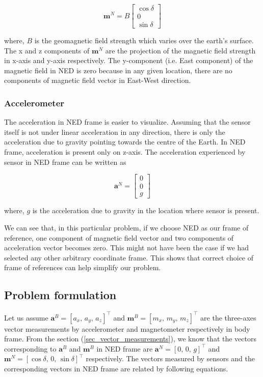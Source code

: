 \documentclass[12pt, a4paper]{article}
\begin{document}
\begin{equation}
    \bm{m}^{N} = 
    B\begin{bmatrix}\cos\delta \\ 0 \\ \sin\delta\end{bmatrix}
\end{equation}

where, $B$ is the geomagnetic field strength which varies over the
earth's surface. The x and z components of $\bm{m}^{N}$ are the projection of the magnetic field strength in x-axis and y-axis respectively. The y-component (i.e. East component) of the magnetic field in NED is zero because in any given location, there are no components of magnetic field vector in East-West direction.

\subsubsection*{Accelerometer}
The acceleration in NED frame is easier to visualize. Assuming that the sensor itself is not under linear acceleration in any direction, there is only the acceleration due to gravity pointing towards the centre of the Earth. In NED frame, acceleration is present only on z-axis. The acceleration experienced by sensor in NED frame can be written as

\begin{equation}
    \bm{a}^{N} =
    \begin{bmatrix}0 \\ 0 \\ g\end{bmatrix}
\end{equation}

where, $g$ is the acceleration due to gravity in the location where sensor is present. \medskip

We can see that, in this particular problem, if we choose NED as our frame of reference, one component of magnetic field vector and two components of acceleration vector becomes zero. This might not have been the case if we had selected any other arbitrary coordinate frame. This shows that  correct choice of frame of references can help simplify our problem.

\subsection{Problem formulation}
Let us assume $\bm{a}^{B} = [a_{x},\,a_{y},\,a_{z}]^{\intercal}$ and $\bm{m}^{B} = [m_{x},\,m_{y},\,m_{z}]^{\intercal}$  are the three-axes vector measurements by accelerometer and magnetometer respectively in body frame. From the section (\ref{sec_vector_measurements}), we know that the vectors corresponding to $\bm{a}^{B}$ and $\bm{m}^{B}$  in NED frame are $\bm{a}^{N} = [0,\,0,\,g]^{\intercal}$ and $\bm{m}^{N} = [\cos{\delta},\,0,\,\sin{\delta}]^{\intercal}$ respectively. The vectors measured by sensors and the corresponding vectors in NED frame are related by following equations.
\end{document}

